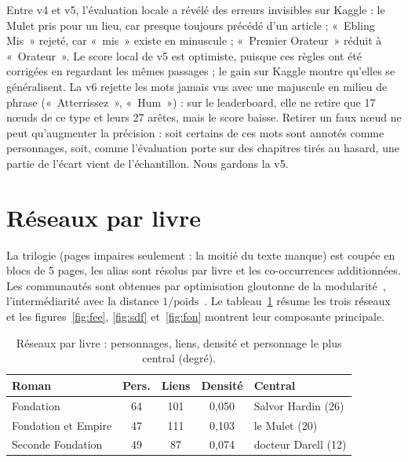 \documentclass[cameraready]{Interspeech}
\begin{document}
Entre v4 et v5, l'évaluation locale a révélé des erreurs invisibles sur Kaggle : le Mulet pris pour un lieu, car
presque toujours précédé d'un article ; «~Ebling Mis~» rejeté, car «~mis~» existe en minuscule ; «~Premier
Orateur~» réduit à «~Orateur~». Le score local de v5 est optimiste, puisque ces règles ont été corrigées en
regardant les mêmes passages ; le gain sur Kaggle montre qu'elles se généralisent. La v6 rejette les mots jamais
vus avec une majuscule en milieu de phrase («~Atterrissez~», «~Hum~») : sur le leaderboard, elle ne retire que
17 nœuds de ce type et leurs 27 arêtes, mais le score baisse. Retirer un faux nœud ne peut qu'augmenter la
précision : soit certains de ces mots sont annotés comme personnages, soit, comme l'évaluation porte sur des
chapitres tirés au hasard, une partie de l'écart vient de l'échantillon. Nous gardons la v5.

\section{Réseaux par livre}

La trilogie (pages impaires seulement : la moitié du texte manque) est coupée en blocs de 5 pages, les alias sont
résolus par livre et les co-occurrences additionnées. Les communautés sont obtenues par optimisation gloutonne de
la modularité~\cite{clauset2004}, l'intermédiarité avec la distance $1/\textrm{poids}$~\cite{brandes2001}. Le
tableau~\ref{tab:livres} résume les trois réseaux et les figures~\ref{fig:fee}, \ref{fig:sdf} et~\ref{fig:fon} montrent leur
composante principale.

\begin{table}[t]
  \caption{Réseaux par livre : personnages, liens, densité et personnage le plus central (degré).}
  \label{tab:livres}
  \centering
  \begin{tabular}{@{}lcccl@{}}
    \toprule
    \textbf{Roman} & \textbf{Pers.} & \textbf{Liens} & \textbf{Densité} & \textbf{Central} \\
    \midrule
    Fondation & 64 & 101 & 0,050 & Salvor Hardin (26) \\
    Fondation et Empire & 47 & 111 & 0,103 & le Mulet (20) \\
    Seconde Fondation & 49 & 87 & 0,074 & docteur Darell (12) \\
    \bottomrule
  \end{tabular}
\end{table}
\end{document}
